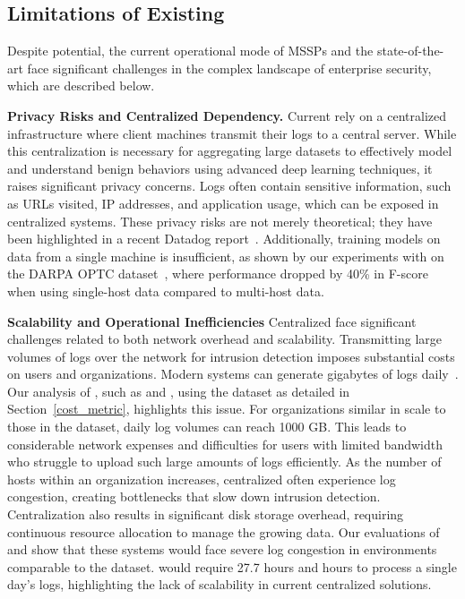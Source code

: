 \subsection{Limitations of Existing \pids}

Despite \pids potential, the current operational mode of MSSPs and the state-of-the-art \pids face significant challenges in the complex landscape of enterprise security, which are described below.

\smallskip
\noindent
\textbf{Privacy Risks and Centralized Dependency.} Current \pids rely on a centralized infrastructure where client machines transmit their logs to a central server. While this centralization is necessary for aggregating large datasets to effectively model and understand benign behaviors using advanced deep learning techniques, it raises significant privacy concerns. Logs often contain sensitive information, such as URLs visited, IP addresses, and application usage, which can be exposed in centralized systems. These privacy risks are not merely theoretical; they have been highlighted in a recent Datadog report~\cite{datadog}. Additionally, training models on data from a single machine is insufficient, as shown by our experiments with \flash on the DARPA OPTC dataset~\cite{darpaoptc}, where performance dropped by 40\% in F-score when using single-host data compared to multi-host data.

    
\smallskip
\noindent
\textbf{Scalability and Operational Inefficiencies}  Centralized \pids face significant challenges related to both network overhead and scalability. Transmitting large volumes of logs over the network for intrusion detection imposes substantial costs on users and organizations. Modern systems can generate gigabytes of logs daily~\cite{inam2023sok,hossain+depend}. Our analysis of \pids, such as \flash and \kairos, using the \optc dataset as detailed in Section~\ref{cost_metric}, highlights this issue. For organizations similar in scale to those in the \optc dataset, daily log volumes can reach 1000 GB. This leads to considerable network expenses and difficulties for users with limited bandwidth who struggle to upload such large amounts of logs efficiently. As the number of hosts within an organization increases, centralized \pids often experience log congestion, creating bottlenecks that slow down intrusion detection. Centralization also results in significant disk storage overhead, requiring continuous resource allocation to manage the growing data. Our evaluations of \flash and \kairos show that these systems would face severe log congestion in environments comparable to the \optc dataset. \flash would require 27.7 hours and  hours to process a single day's logs, highlighting the lack of scalability in current centralized \pids solutions.




